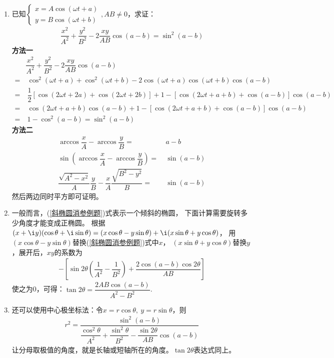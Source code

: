 \begin{enumerate}[label={【\textbf{例\thechapter.\arabic*}】},
 leftmargin=\inteval{\myenumleftmargin}pt,
 itemsep=\inteval{\myenumitempsep}pt,
 itemindent=\inteval{\myenumitemindent}pt]
\item 已知$ \left\{ \begin{aligned}
    x=A\cos(\omega t+a) \\
    y=B\cos(\omega t+b)
\end{aligned}
\right. , AB\neq 0 $，求证：
\begin{align}\label{斜椭圆消参例题}
    \dfrac{x^2}{A^2}+\dfrac{y^2}{B^2}-2\dfrac{xy}{AB}\cos(a-b)=\sin^2(a-b)
\end{align}
\textbf{方法一}\ 
\begin{align*}
    & \dfrac{x^2}{A^2}+\dfrac{y^2}{B^2}-2\dfrac{xy}{AB}\cos(a-b) \\
    =&\  \cos^2(\omega t+a)+\cos^2(\omega t+b)-2\cos(\omega t+a)\cos(\omega t+b)\cos(a-b) \\
    =&\  \dfrac{1}{2}[\cos(2\omega t+2a)+\cos(2\omega t+2b)]+1-[\cos(2\omega t+a+b)+\cos(a-b)]\cos(a-b)\\
    =&\  \cos(2\omega t+a+b)\cos(a-b) +1-[\cos(2\omega t+a+b)+\cos(a-b)]\cos(a-b)\\
    =&\  1-\cos^2(a-b) =\sin^2(a-b)
\end{align*}
\textbf{方法二}\ 
\begin{align*}
    \arccos\dfrac{x}{A}-\arccos\dfrac{y}{B}=&\ a-b \\
    \sin\left( \arccos\dfrac{x}{A}-\arccos\dfrac{y}{B} \right) =&\ \sin(a-b) \\
    \dfrac{\sqrt{A^2-x^2}}{A}\dfrac{y}{B}-\dfrac{x}{A}\dfrac{\sqrt{B^2-y^2}}{B}=&\ \sin(a-b)
\end{align*}
然后两边同时平方即可证明。

\item 一般而言，(\ref{斜椭圆消参例题})式表示一个倾斜的椭圆，
下面计算需要旋转多少角度才能变成正椭圆。
根据$ (x+\i y)(\cos\theta +\i\sin \theta)=(x\cos\theta-y\sin\theta)+
\i(x\sin\theta+y\cos\theta) $，
用$ (x\cos\theta-y\sin\theta) $替换(\ref{斜椭圆消参例题})式中$ x $，
$ (x\sin\theta+y\cos\theta) $替换$ y $，展开后，$ xy $的系数为
\begin{align*}
    -\left[\sin2\theta\left(\dfrac{1}{A^2}-\dfrac{1}{B^2} \right) + \dfrac{2\cos(a-b)\cos2\theta }{AB}\right] 
\end{align*}
使之为0，可得：$ \tan2\theta =\dfrac{2AB\cos(a-b)}{A^2-B^2} $. 
\item 还可以使用中心极坐标法：令$ x=r\cos\theta,\ y=r\sin\theta $，则
\begin{align*}
    r^2=\dfrac{\sin^2(a-b)}{\dfrac{\cos^2\theta}{A^2}+
        \dfrac{ \sin^2\theta}{B^2}-\dfrac{\sin2\theta}{AB}\cos(a-b)}
\end{align*}
让分母取极值的角度，就是长轴或短轴所在的角度。$ \tan2\theta $表达式同上。 


\end{enumerate}
